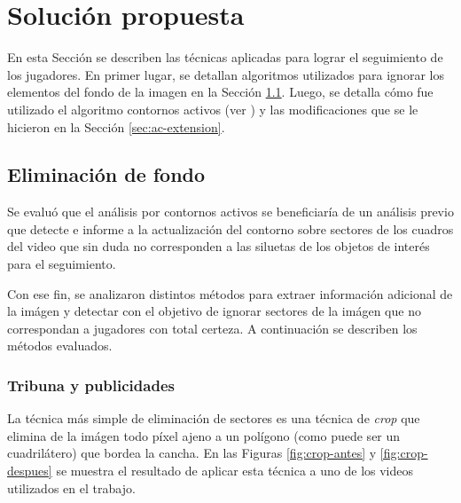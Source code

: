 \chapter{Solución propuesta}
\label{chap-solution}

En esta Sección se describen las técnicas aplicadas para lograr el seguimiento
de los jugadores. En primer lugar, se detallan algoritmos utilizados para
ignorar los elementos del fondo de la imagen en la Sección
\ref{sec:background-elimination}. Luego, se detalla cómo fue utilizado el
algoritmo contornos activos (ver \cite{fast-level-set}) y las modificaciones
que se le hicieron en la Sección \ref{sec:ac-extension}.

\section{Eliminación de fondo}

\label{sec:background-elimination}
Se evaluó que el análisis por contornos activos se beneficiaría de un análisis
previo que detecte e informe a la actualización del contorno sobre sectores de
los cuadros del video que sin duda no corresponden a las siluetas de los
objetos de interés para el seguimiento.

Con ese fin, se analizaron distintos métodos para extraer información adicional
de la imágen y detectar con el objetivo de ignorar sectores de la imágen que no
correspondan a jugadores con total certeza. A continuación se describen los
métodos evaluados.

\subsection{Tribuna y publicidades}
\label{subsec:crop-tribunas}

La técnica más simple de eliminación de sectores es una técnica de
\textit{crop} que elimina de la imágen todo píxel ajeno a un polígono
(como puede ser un cuadrilátero) que bordea la cancha. En las Figuras
\ref{fig:crop-antes} y \ref{fig:crop-despues} se muestra el resultado
de aplicar esta técnica a uno de los videos utilizados en el trabajo.

